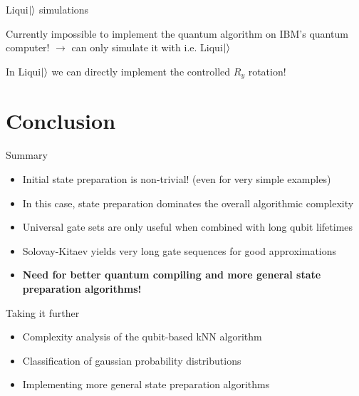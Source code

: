 \documentclass[10pt]{beamer}
\begin{document}
{
\begin{frame}{Liqui$\ket{}$ simulations}
	
Currently impossible to implement the quantum algorithm on IBM's quantum computer!
$\rightarrow$ can only simulate it with i.e. Liqui$\ket{}$

In Liqui$\ket{}$ we can directly implement the controlled $R_y$ rotation!


\end{frame}
}

\section{Conclusion}

\begin{frame}{Summary}
\begin{itemize}
\item Initial state preparation is non-trivial! (even for very simple examples)
\item In this case, state preparation dominates the overall algorithmic complexity
\item Universal gate sets are only useful when combined with long qubit lifetimes
\item Solovay-Kitaev yields very long gate sequences for good approximations
\item \textbf{Need for better quantum compiling and more general state preparation algorithms!}
\end{itemize}
\end{frame}

\begin{frame}{Taking it further}

\begin{itemize}
\item Complexity analysis of the qubit-based kNN algorithm
\item Classification of gaussian probability distributions
\item Implementing more general state preparation algorithms
\end{itemize}
\end{frame}
\end{document}

